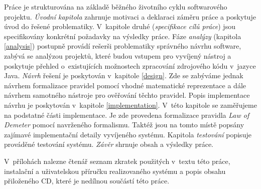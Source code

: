 Práce je strukturována na základě běžného životního cyklu softwarového projektu. \emph{Úvodní kapitola} zahrnuje motivaci a deklaraci záměru práce a poskytuje úvod do řešené problematiky. V~kapitole druhé (\emph{specifikace cílů práce}) jsou specifikovány konkrétní požadavky na výsledky práce. Fáze \emph{analýzy} (kapitola \ref{analysis}) postupně provádí rešerši problematiky správného návrhu software, zabývá se analýzou projektů, které budou vstupem pro vyvíjený nástroj a poskytuje přehled o~existujících možnostech zpracování zdrojového kódu v~jazyce Java. \emph{Návrh} řešení je poskytován v~kapitole \ref{design}. Zde se zabýváme jednak návrhem formalizace pravidel pomocí vhodné matematické reprezentace a dále návrhem samotného nástroje pro ověřování těchto pravidel. Popis implementace návrhu je poskytován v~kapitole \ref{implementation}. V~této kapitole se zaměřujeme na podstatné části implementace. Je zde provedena formalizace pravidla \emph{Law of Demeter} pomocí navrženého formalismu. Taktéž jsou na tomto místě popsány zajímavé implementační detaily vyvíjeného systému. Kapitola \emph{testování} popisuje prováděné testování systému. \emph{Závěr} shrnuje obsah a výsledky práce.

V~přílohách nalezne čtenář seznam zkratek použitých v~textu této práce, instalační a uživatelskou příručku realizovaného systému a popis obsahu přiloženého CD, které je nedílnou součástí této práce.
